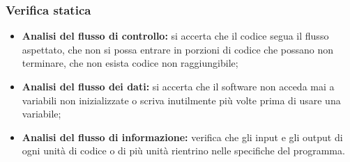    \subsubsection{Verifica statica}
   \begin{itemize}
   
   \item \textbf{Analisi del flusso di controllo:} si accerta che il codice segua il flusso aspettato, che non si possa entrare in porzioni di codice che possano non
   terminare, che non esista codice non raggiungibile;
   \item \textbf{Analisi del flusso dei dati:} si accerta che il software non acceda mai a variabili non inizializzate o scriva inutilmente più volte prima di usare una variabile;
   \item \textbf{Analisi del flusso di informazione:} verifica che gli input e gli output di ogni unità di codice o di più unità rientrino nelle specifiche del programma.
   
  
   \end{itemize}
   
